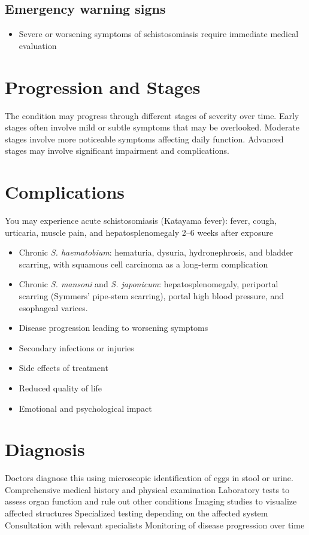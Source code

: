 \subsection{Emergency warning signs}
\begin{itemize}[noitemsep]
  \item Severe or worsening symptoms of schistosomiasis require immediate medical evaluation
\end{itemize}
\section{Progression and Stages}
The condition may progress through different stages of severity over time. Early stages often involve mild or subtle symptoms that may be overlooked. Moderate stages involve more noticeable symptoms affecting daily function. Advanced stages may involve significant impairment and complications.
\section{Complications}
You may experience acute schistosomiasis (Katayama fever): fever, cough, urticaria, muscle pain, and hepatosplenomegaly 2--6 weeks after exposure

\begin{itemize}[noitemsep]
  \item Chronic \textit{S. haematobium}: hematuria, dysuria, hydronephrosis, and bladder scarring, with squamous cell carcinoma as a long-term complication
  \item Chronic \textit{S. mansoni} and \textit{S. japonicum}: hepatosplenomegaly, periportal scarring (Symmers' pipe-stem scarring), portal high blood pressure, and esophageal varices.
  \item Disease progression leading to worsening symptoms
  \item Secondary infections or injuries
  \item Side effects of treatment
  \item Reduced quality of life
  \item Emotional and psychological impact
\end{itemize}
\section{Diagnosis}
Doctors diagnose this using microscopic identification of eggs in stool or urine. Comprehensive medical history and physical examination Laboratory tests to assess organ function and rule out other conditions Imaging studies to visualize affected structures Specialized testing depending on the affected system Consultation with relevant specialists Monitoring of disease progression over time

